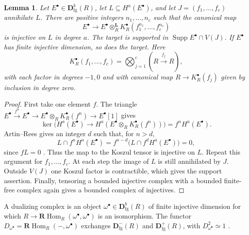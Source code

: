 \documentclass[11pt]{amsart}
\numberwithin{equation}{section}
\newtheorem{lemma}[theorem]{Lemma}
\theoremstyle{definition}
\theoremstyle{remark}
\DeclareMathOperator{\Supp}{Supp}
\DeclareMathOperator{\Hom}{Hom}
\newcommand{\RHom}{\mathbf R\!\Hom}
\newcommand{\D}{\mathbf D}
\newcommand{\fg}{\mathrm{fg}}
\begin{document}
\begin{lemma}\label{lem:koszul-embedding}
Let $E^{\bullet}\in\D^b_{\fg}(R)$, let $L\subseteq H^a(E^{\bullet})$, and let
$J=(f_1,\ldots,f_c)$ annihilate $L$. There are positive integers
$n_1,\ldots,n_c$ such that the canonical map
\[
 E^{\bullet}\longrightarrow E^{\bullet}\otimes_R^{\mathbf L}
 K_R^{\bullet}(f_1^{n_1},\ldots,f_c^{n_c})
\]
is injective on $L$ in degree $a$. The target is supported in
$\Supp E^{\bullet}\cap V(J)$. If $E^{\bullet}$ has finite injective dimension, so does
the target. Here
\[
 K_R^{\bullet}(f_1,\ldots,f_c)=
 \bigotimes_{j=1}^c(R\xrightarrow{f_j}R),
\]
with each factor in degrees $-1,0$ and with canonical map
$R\to K_R^{\bullet}(f_j)$ given by inclusion in degree zero.
\end{lemma}
\begin{proof}
First take one element $f$. The triangle
$E^{\bullet}\xrightarrow{f^n}E^{\bullet}\to E^{\bullet}\otimes_RK_R^{\bullet}(f^n)\to E^{\bullet}[1]$ gives
\[
 \ker\bigl(H^a(E^{\bullet})\to H^a(E^{\bullet}\otimes_RK_R^{\bullet}(f^n))\bigr)=f^nH^a(E^{\bullet}).
\]
Artin--Rees gives an integer $d$ such that, for $n>d$,
\[
 L\cap f^nH^a(E^{\bullet})
 =f^{n-d}\bigl(L\cap f^dH^a(E^{\bullet})\bigr)=0,
\]
since $fL=0$ \cite[Tag~00IN]{Stacks}. Thus the map to the Koszul tensor
is injective on $L$. Repeat this argument for $f_1,\ldots,f_c$.
At each step the image of $L$ is still annihilated by $J$.
Outside $V(J)$ one Koszul factor is contractible, which gives the
support assertion. Finally, tensoring a bounded injective complex
with a bounded finite-free complex again gives a bounded complex
of injectives.
\end{proof}

A dualizing complex is an object $\omega^{\bullet}\in\D^b_{\fg}(R)$ of finite
injective dimension for which
$R\to\RHom_R(\omega^{\bullet},\omega^{\bullet})$ is an isomorphism. The functor
$D_{\omega^{\bullet}}=\RHom_R(-,\omega^{\bullet})$ exchanges $\D^-_{\fg}(R)$ and
$\D^+_{\fg}(R)$, with $D_{\omega^{\bullet}}^2\simeq1$
\cite[Tag~0A7C]{Stacks}.
\end{document}
